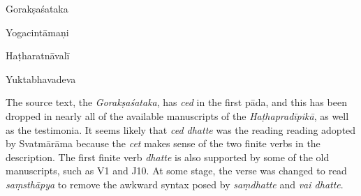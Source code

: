 \begin{ekdosis}
\begin{sources}[hp02_060]
Gorakṣaśataka

\begin{versinnote}
\end{versinnote}
\end{sources}

\begin{testimonia}[hp02_060]
Yogacintāmaṇi

\begin{versinnote}
\end{versinnote}

Haṭharatnāvalī

\begin{versinnote}
\end{versinnote}

Yuktabhavadeva

\begin{versinnote}
\end{versinnote}
\end{testimonia}

\begin{philcomm}[hp02_060]
The source text, the \emph{Gorakṣaśataka}, has \emph{ced} in the first pāda, and this has been dropped in nearly all of the available manuscripts of the \emph{Haṭhapradīpikā}, as well as the testimonia. It seems likely that \emph{ced dhatte} was the reading reading adopted by Svatmārāma because the \emph{cet} makes sense of the two finite verbs in the description. The first finite verb \emph{dhatte} is also supported by some of the old manuscripts, such as V1 and J10. At some stage, the verse was changed to read \emph{saṃsthāpya} to remove the awkward syntax posed by \emph{saṃdhatte} and \emph{vai dhatte}.
\end{philcomm}


\end{ekdosis}
